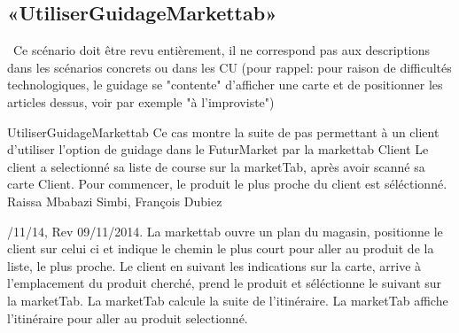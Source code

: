 \subsection{«UtiliserGuidageMarkettab»}
\TODO\ Ce scénario doit être revu entièrement, il ne correspond pas aux descriptions dans les scénarios concrets ou dans les CU (pour rappel: pour raison de difficultés technologiques, le guidage se "contente" d'afficher une carte et de positionner les articles dessus, voir par exemple "à l'improviste")

\startCU
\nom UtiliserGuidageMarkettab
\but Ce cas montre la suite de pas permettant à un client d'utiliser l'option de guidage dans le FuturMarket par la markettab
\acteur Client
\precondition Le client a selectionné sa liste de course sur la marketTab, après avoir scanné sa carte Client. Pour commencer, le produit le plus proche du client est séléctionné.
\auteur Raissa Mbabazi Simbi, François Dubiez
\date 7/11/14, Rev 09/11/2014.
\nominal %
\startnominal
\etape[UGM:SA1] La markettab ouvre un plan du magasin, positionne le client sur celui ci et indique le chemin le plus court pour aller au produit de la liste, le plus proche.
 Le client en suivant les indications sur la carte, arrive à l'emplacement du produit cherché, prend le produit et séléctionne le suivant sur la marketTab.
\etape La marketTab calcule la suite de l'itinéraire.
\stopnominal
\postcondition La marketTab affiche l'itinéraire pour aller au produit selectionné.

